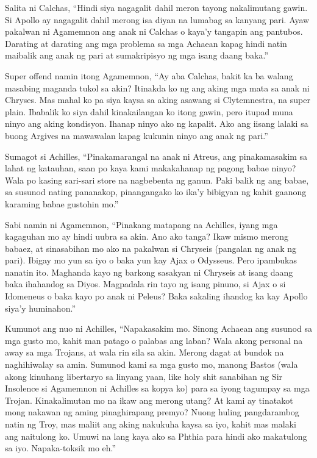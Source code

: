 \documentclass[12pt,letterpaper]{report}
\begin{document}
Salita ni Calchas, ``Hindi siya nagagalit dahil meron tayong nakalimutang gawin. Si Apollo ay nagagalit dahil merong isa diyan na lumabag sa kanyang pari. Ayaw pakalwan ni Agamemnon ang anak ni Calchas o kaya'y tangapin ang pantubos. Darating at darating ang mga problema sa mga Achaean kapag hindi natin maibalik ang anak ng pari at sumakripisyo ng mga isang daang baka.''

Super offend namin itong Agamemnon, ``Ay aba Calchas, bakit ka ba walang masabing maganda tukol sa akin? Itinakda ko ng ang aking mga mata sa anak ni Chryses. Mas mahal ko pa siya kaysa sa aking asawang si Clytemnestra, na super plain. Ibabalik ko siya dahil kinakailangan ko itong gawin, pero itupad muna ninyo ang aking kondisyon. Ihanap ninyo ako ng kapalit. Ako ang iisang lalaki sa buong Argives na mawawalan kapag kukunin ninyo ang anak ng pari.''

Sumagot si Achilles, ``Pinakamarangal na anak ni Atreus, ang pinakamasakim sa lahat ng katauhan, saan po kaya kami makakahanap ng pagong babae ninyo? Wala po kasing sari-sari store na nagbebenta ng ganun. Paki balik ng ang babae, sa susunod nating pananakop, pinangangako ko ika'y bibigyan ng kahit gaanong karaming babae gustohin mo.''

Sabi namin ni Agamemnon, ``Pinakang matapang na Achilles, iyang mga kagaguhan mo ay hindi uubra sa akin. Ano ako tanga? Ikaw mismo merong babaez, at sinasabihan mo ako na pakalwan si Chryseis (pangalan ng anak ng pari). Ibigay mo yun sa iyo o baka yun kay  Ajax o Odysseus. Pero ipambukas nanatin ito. Maghanda kayo ng barkong sasakyan ni Chryseis at isang daang baka ihahandog sa Diyos. Magpadala rin tayo ng isang pinuno, si Ajax o si Idomeneus o baka kayo po anak ni Peleus? Baka sakaling ihandog ka kay Apollo siya'y huminahon.''

Kumunot ang nuo ni Achilles, ``Napakasakim mo. Sinong Achaean ang susunod sa mga gusto mo, kahit man patago o palabas ang laban? Wala akong personal na away sa mga Trojans, at wala rin sila sa akin. Merong dagat at bundok na naghihiwalay sa amin. Sumunod kami sa mga gusto mo, manong Bastos (wala akong kinuhang libertaryo sa linyang yaan, like holy shit sanabihan ng Sir Insolence si Agamemnon ni Achilles sa kopya ko) para sa iyong tagumpay sa mga Trojan. Kinakalimutan mo na ikaw ang merong utang? At kami ay tinatakot mong nakawan ng aming pinaghirapang premyo? Nuong huling pangdarambog natin ng Troy, mas maliit ang aking nakukuha kaysa sa iyo, kahit mas malaki ang naitulong ko. Umuwi na lang kaya ako sa Phthia para hindi ako makatulong sa iyo. Napaka-toksik mo eh.''
\end{document}
